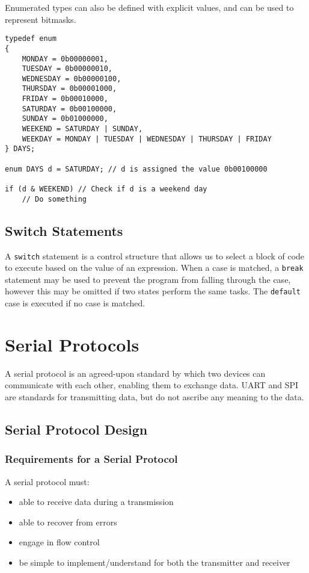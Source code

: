 \documentclass{report}
\begin{document}
Enumerated types can also be defined with explicit values, and can be
used to represent bitmasks.
\begin{verbatim}
typedef enum
{
    MONDAY = 0b00000001,
    TUESDAY = 0b00000010,
    WEDNESDAY = 0b00000100,
    THURSDAY = 0b00001000,
    FRIDAY = 0b00010000,
    SATURDAY = 0b00100000,
    SUNDAY = 0b01000000,
    WEEKEND = SATURDAY | SUNDAY,
    WEEKDAY = MONDAY | TUESDAY | WEDNESDAY | THURSDAY | FRIDAY
} DAYS;

enum DAYS d = SATURDAY; // d is assigned the value 0b00100000

if (d & WEEKEND) // Check if d is a weekend day
    // Do something
\end{verbatim}
\section{Switch Statements}
A \texttt{switch} statement is a control structure that allows
us to select a block of code to execute based on the value of an
expression. When a case is matched, a \texttt{break} statement
may be used to prevent the program from falling through the case,
however this may be omitted if two states perform the same tasks. The
\texttt{default} case is executed if no case is matched.
\chapter{Serial Protocols}
A serial protocol is an agreed-upon standard by which two devices can
communicate with each other, enabling them to exchange data. UART and
SPI are standards for transmitting data, but do not ascribe any meaning
to the data.
\section{Serial Protocol Design}
\subsection{Requirements for a Serial Protocol}
A serial protocol must:
\begin{itemize}
    \item able to receive data during a transmission
    \item able to recover from errors
    \item engage in flow control
    \item be simple to implement/understand for both the transmitter
          and receiver
\end{itemize}
\end{document}
